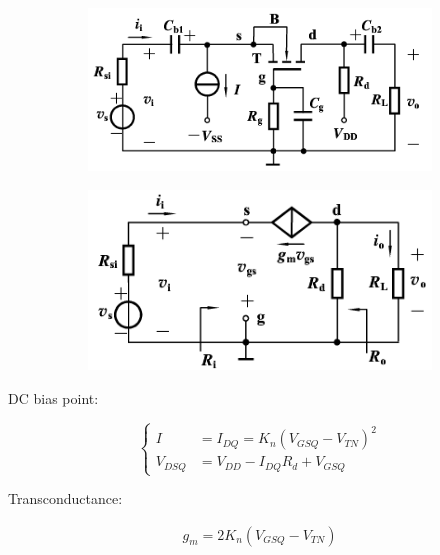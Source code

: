 \begin{figure}[H]
  \centering
  \begin{subfigure}{.5\textwidth}
    \centering
    \includegraphics[width=\linewidth]{figures/MOSFET-Common-G}
  \end{subfigure}
  \begin{subfigure}{.45\textwidth}
    \centering
    \includegraphics[width=\linewidth]{figures/MOSFET-Common-Gs}
  \end{subfigure}
\end{figure}

DC bias point:

\begin{equation*}
  \left\{
  \begin{aligned}
    I &= I_{DQ} = K_n \left( V_{GSQ} - V_{TN} \right)^2 \\
    V_{DSQ} &= V_{DD} - I_{DQ} R_d + V_{GSQ}
  \end{aligned}
  \right.
\end{equation*}

Transconductance:

\begin{equation*}
  \begin{aligned}
    g_m = 2 K_n \left( V_{GSQ} - V_{TN} \right)
  \end{aligned}
\end{equation*}

